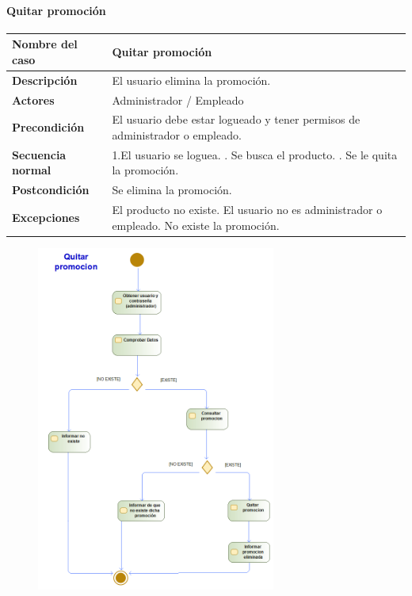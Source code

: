 \paragraph{Quitar promoción}
\begin{table}[H]
	\centering
	\small
	\begin{tabularx}{0.8\textwidth}{|p{3.5cm}|X|}
		\hline
		\rowcolor{lightgray}
		\textbf{Nombre del caso}  & \textbf{Quitar promoción}                                                    \\
		\hline
		\textbf{Descripción}      & El usuario elimina la promoción.                                             \\
		\hline
		\textbf{Actores}          & Administrador / Empleado                                                     \\
		\hline
		\textbf{Precondición}     & El usuario debe estar logueado y tener permisos de administrador o empleado. \\
		\hline
		\textbf{Secuencia normal} & 1.El usuario se loguea. \newline
		2. Se busca el producto. \newline
		3. Se le quita la promoción.                                                                             \\
		\hline
		\textbf{Postcondición}    & Se elimina la promoción.                                                     \\
		\hline
		\textbf{Excepciones}      & El producto no existe.
		\newline El usuario no es administrador o empleado. \newline No existe la promoción.                     \\
		\hline
	\end{tabularx}
\end{table}
\begin{figure}[H]
	\centering
	\includegraphics[width=0.7\textwidth]{Use_Cases/quitar_promocion.png}
\end{figure}
\newpage
